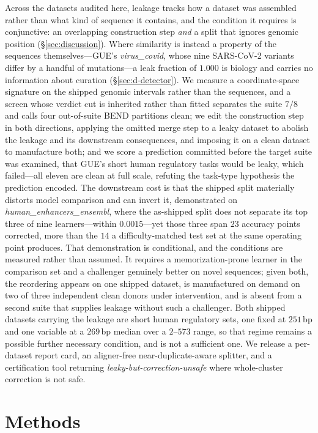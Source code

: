 \documentclass[webpdf,modern,large,namedate]{oup-authoring-template}%
\begin{document}
Across the datasets audited here, leakage tracks how a dataset was assembled rather than what kind of sequence it contains, and the condition it requires is conjunctive: an overlapping construction step \emph{and} a split that ignores genomic position (\S\ref{sec:discussion}). Where similarity is instead a property of the sequences themselves---GUE's \textit{virus\_covid}, whose nine SARS-CoV-2 variants differ by a handful of mutations---a leak fraction of $1.000$ is biology and carries no information about curation (\S\ref{sec:d-detector}). We measure a coordinate-space signature on the shipped genomic intervals rather than the sequences, and a screen whose verdict cut is inherited rather than fitted separates the suite $7/8$ and calls four out-of-suite BEND partitions clean; we edit the construction step in both directions, applying the omitted merge step to a leaky dataset to abolish the leakage and its downstream consequences, and imposing it on a clean dataset to manufacture both; and we score a prediction committed before the target suite was examined, that GUE's short human regulatory tasks would be leaky, which failed---all eleven are clean at full scale, refuting the task-type hypothesis the prediction encoded. The downstream cost is that the shipped split materially distorts model comparison and can invert it, demonstrated on \textit{human\_enhancers\_ensembl}, where the as-shipped split does not separate its top three of nine learners---within $0.0015$---yet those three span $23$ accuracy points corrected, more than the $14$ a difficulty-matched test set at the same operating point produces. That demonstration is conditional, and the conditions are measured rather than assumed. It requires a memorization-prone learner in the comparison set and a challenger genuinely better on novel sequences; given both, the reordering appears on one shipped dataset, is manufactured on demand on two of three independent clean donors under intervention, and is absent from a second suite that supplies leakage without such a challenger. Both shipped datasets carrying the leakage are short human regulatory sets, one fixed at $251$\,bp and one variable at a $269$\,bp median over a $2$--$573$ range, so that regime remains a possible further necessary condition, and is not a sufficient one. We release a per-dataset report card, an aligner-free near-duplicate-aware splitter, and a certification tool returning \emph{leaky-but-correction-unsafe} where whole-cluster correction is not safe.

\section{Methods}\label{sec:methods}
\end{document}
